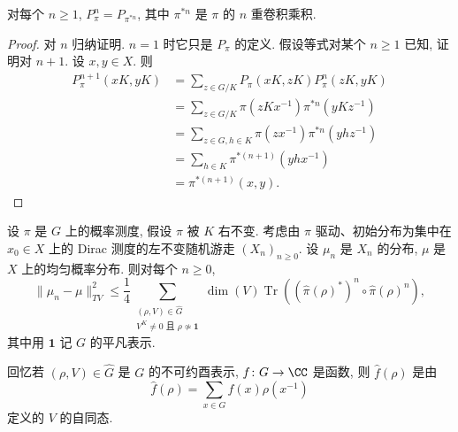\begin{proposition}[转移矩阵与卷积]
\label{prop:VI.4.5}
对每个 $n \geq 1$, $P_{\pi}^n = P_{\pi^{*n}}$, 其中 $\pi^{*n}$ 是 $\pi$ 的 $n$ 重卷积乘积.
\end{proposition}

\begin{proof}
对 $n$ 归纳证明. $n = 1$ 时它只是 $P_{\pi}$ 的定义. 假设等式对某个 $n \geq 1$ 已知, 证明对 $n+1$. 设 $x, y \in X$. 则
\begin{align*}
P_{\pi}^{n+1}(xK, yK) &= \sum_{z \in G/K}P_{\pi}(xK, zK)P_{\pi}^n(zK, yK) \\
&= \sum_{z \in G/K}\pi(zKx^{-1})\pi^{*n}(yKz^{-1}) \\
&= \sum_{z \in G, h \in K}\pi(zx^{-1})\pi^{*n}(yhz^{-1}) \\
&= \sum_{h \in K}\pi^{*(n+1)}(yhx^{-1}) \\
&= \pi^{*(n+1)}(x, y).
\end{align*}
\end{proof}

\begin{corollary}
\label{cor:VI.4.6}
设 $\pi$ 是 $G$ 上的概率测度, 假设 $\pi$ 被 $K$ 右不变. 考虑由 $\pi$ 驱动、初始分布为集中在 $x_0 \in X$ 上的 Dirac 测度的左不变随机游走 $(X_n)_{n \geq 0}$. 设 $\mu_n$ 是 $X_n$ 的分布, $\mu$ 是 $X$ 上的均匀概率分布.
则对每个 $n \geq 0$,
\[
\|\mu_n - \mu\|_{TV}^2 \leq \frac{1}{4}\sum_{\substack{(\rho, V) \in \widehat{G}\\ V^K \neq 0 \text{ 且 } \rho \not\simeq \mathbf{1}}}\dim(V)\operatorname{Tr}((\hat{\pi}(\rho)^*)^n \circ \hat{\pi}(\rho)^n),
\]
其中用 $\mathbf{1}$ 记 $G$ 的平凡表示.
\end{corollary}

回忆若 $(\rho, V) \in \widehat{G}$ 是 $G$ 的不可约酉表示, $f \colon G \to \CC$ 是函数, 则 $\hat{f}(\rho)$ 是由
\[
\hat{f}(\rho) = \sum_{x \in G}f(x)\rho(x^{-1})
\]
定义的 $V$ 的自同态.

